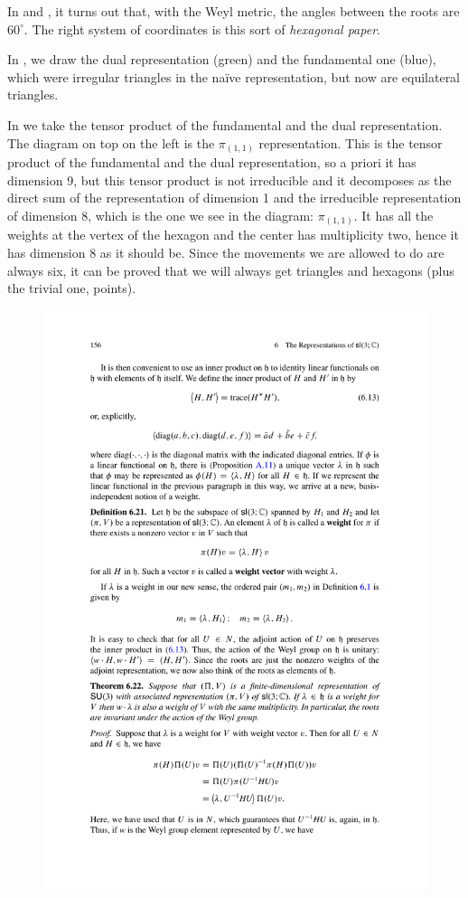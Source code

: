 \documentclass[../main.tex]{subfiles}
\begin{document}
In  and , it turns out that, with the Weyl metric, the angles between the roots are $60^\circ$. The right system of coordinates is this sort of \textit{hexagonal paper}.

In , we draw the dual representation ({\color{Green}green}) and the fundamental one (blue), which were irregular triangles in the naïve representation, but now are equilateral triangles.

In  we take the tensor product of the fundamental and the dual representation. The diagram on top on the left is the $\pi_{(1,1)}$ representation. This is the tensor product of the fundamental and the dual representation, so a priori it has dimension 9, but this tensor product is not irreducible and it decomposes as the direct sum of the representation of dimension 1 and the irreducible representation of dimension 8, which is the one we see in the diagram: $\pi_{(1,1)}$. It has all the weights at the vertex of the hexagon and the center has multiplicity two, hence it has dimension 8 as it should be. Since the movements we are allowed to do are always six, it can be proved that we will always get triangles and hexagons (plus the trivial one, points).
\begin{figure}[h!]
	\includegraphics{images/hall_166_c.pdf}
	\caption[]{}
\end{figure}
\end{document}
